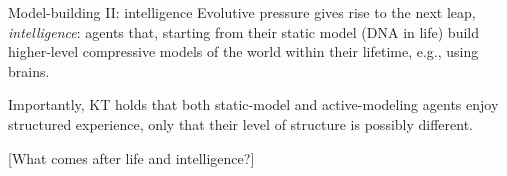 \begin{frame}[label=ladila]{Model-building II: intelligence}
 Evolutive pressure gives rise to the next leap, {\em intelligence}: agents that, starting from their static model (DNA in life)   build higher-level compressive models of the world within their lifetime, e.g., using brains.\vfill
 
 Importantly, KT holds that both static-model and active-modeling agents enjoy structured experience, only that their level of structure is possibly different.  \vfill
 
 
 [What comes after life and intelligence?]
 
\end{frame}





